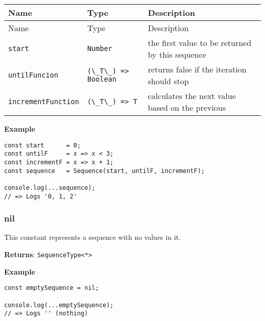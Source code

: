 \begin{longtable}[]{
  >{\raggedright\arraybackslash}p{}
  >{\raggedright\arraybackslash}p{}
  >{\raggedright\arraybackslash}p{}@{}}

\toprule\noalign{}
Name & Type & Description \\
\midrule\noalign{}
\endfirsthead
\toprule\noalign{}
Name & Type & Description \\
\midrule\noalign{}
\endhead
\bottomrule\noalign{}
\endlastfoot
\passthrough{\lstinline!start!} & \passthrough{\lstinline!Number!} & the
first value to be returned by this sequence \\
\passthrough{\lstinline!untilFuncion!} &
\passthrough{\lstinline!(\_T\_) => Boolean!} & returns false if the
iteration should stop \\
\passthrough{\lstinline!incrementFunction!} &
\passthrough{\lstinline!(\_T\_) => T!} & calculates the next value based
on the previous \\
\end{longtable}

\textbf{Example}

\begin{lstlisting}[label=559ccb9f-6cec-4f05-b202-041bc70395bf]
const start      = 0;
const untilF     = x => x < 3;
const incrementF = x => x + 1;
const sequence   = Sequence(start, untilF, incrementF);
                                                       
console.log(...sequence);
// => Logs '0, 1, 2'
\end{lstlisting}

\hypertarget{eb038883-6cbc-4daf-ad04-f8c2e25f9a33}{%
\subsubsection{nil}\label{eb038883-6cbc-4daf-ad04-f8c2e25f9a33}}

This constant represents a sequence with no values in it.

\textbf{Returns}: \passthrough{\lstinline!SequenceType<*>!}

\textbf{Example}

\begin{lstlisting}[label=5c45c9fa-4663-4eae-8965-8bea240591b4]
const emptySequence = nil;
                              
console.log(...emptySequence);
// => Logs '' (nothing)
\end{lstlisting}

